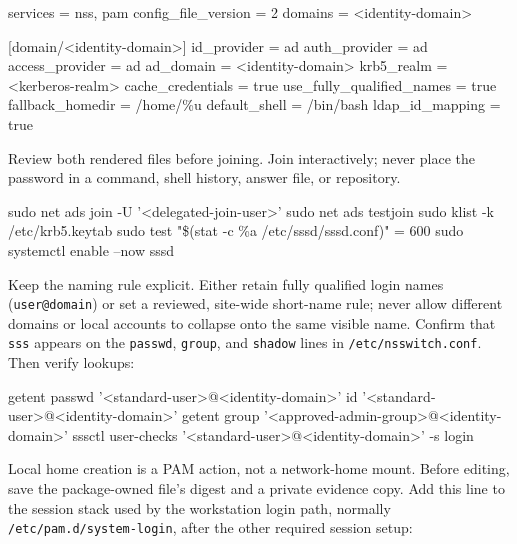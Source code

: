 \begin{shellblock}
[sssd]
services = nss, pam
config\_file\_version = 2
domains = <identity-domain>

[domain/<identity-domain>]
id\_provider = ad
auth\_provider = ad
access\_provider = ad
ad\_domain = <identity-domain>
krb5\_realm = <kerberos-realm>
cache\_credentials = true
use\_fully\_qualified\_names = true
fallback\_homedir = /home/\%u
default\_shell = /bin/bash
ldap\_id\_mapping = true
\end{shellblock}

Review both rendered files before joining. Join interactively; never place the
password in a command, shell history, answer file, or repository.

\begin{shellblock}
sudo net ads join -U '<delegated-join-user>'
sudo net ads testjoin
sudo klist -k /etc/krb5.keytab
sudo test "\$(stat -c \%a /etc/sssd/sssd.conf)" = 600
sudo systemctl enable --now sssd
\end{shellblock}


Keep the naming rule explicit. Either retain fully qualified login names
(\texttt{user@domain}) or set a reviewed, site-wide short-name rule; never
allow different domains or local accounts to collapse onto the same visible
name. Confirm that \texttt{sss} appears on the \texttt{passwd}, \texttt{group},
and \texttt{shadow} lines in \texttt{/etc/nsswitch.conf}. Then verify lookups:

\begin{shellblock}
getent passwd '<standard-user>@<identity-domain>'
id '<standard-user>@<identity-domain>'
getent group '<approved-admin-group>@<identity-domain>'
sssctl user-checks '<standard-user>@<identity-domain>' -s login
\end{shellblock}


Local home creation is a PAM action, not a network-home mount. Before editing,
save the package-owned file's digest and a private evidence copy. Add this line
to the session stack used by the workstation login path, normally
\texttt{/etc/pam.d/system-login}, after the other required session setup:

